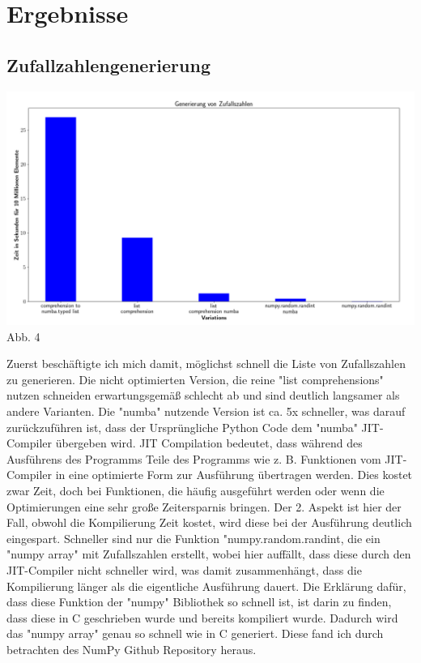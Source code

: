 \documentclass[12pt,a4paper]{article}
\begin{document}
\clearpage
\section{Ergebnisse}

\subsection{Zufallzahlengenerierung}

\begin{center}
    \hspace*{-1.5cm}\includegraphics[width=1.2\textwidth]{./diagramme/matplotlib/zufallszahlen.png}
    Abb. 4
\end{center}

Zuerst beschäftigte ich mich damit, möglichst schnell die Liste von Zufallszahlen zu generieren.
Die nicht optimierten Version, die reine "list comprehensions" nutzen schneiden erwartungsgemäß schlecht ab
und sind deutlich langsamer als andere Varianten. Die "numba" nutzende Version ist ca. 5x schneller,
was darauf zurückzuführen ist, dass der Ursprüngliche Python Code dem "numba" JIT-Compiler übergeben wird.
JIT Compilation bedeutet, dass während des Ausführens des Programms Teile des Programms wie z. B. Funktionen
vom JIT-Compiler in eine optimierte Form zur Ausführung übertragen werden. Dies kostet zwar Zeit, doch bei
Funktionen, die häufig ausgeführt werden oder wenn die Optimierungen eine sehr große Zeitersparnis bringen.
Der 2. Aspekt ist hier der Fall, obwohl die Kompilierung Zeit kostet, wird diese bei der Ausführung deutlich eingespart.
Schneller sind nur die Funktion "numpy.random.randint, die ein "numpy array" mit Zufallszahlen erstellt,
wobei hier auffällt, dass diese durch den JIT-Compiler nicht schneller wird, was damit zusammenhängt, dass die Kompilierung
länger als die eigentliche Ausführung dauert. Die Erklärung dafür, dass diese Funktion der "numpy" Bibliothek
so schnell ist, ist darin zu finden, dass diese in C geschrieben wurde und bereits kompiliert wurde. Dadurch wird
das "numpy array" genau so schnell wie in C generiert. Diese fand ich durch betrachten des NumPy Github Repository heraus.
\end{document}
